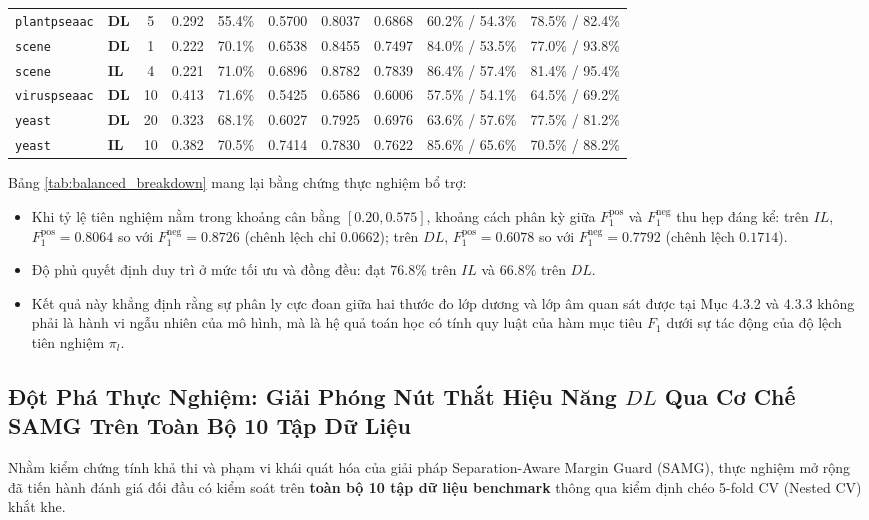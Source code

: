 \documentclass[10pt,a4paper]{article}
\begin{document}
\begin{table}[H]
{\begin{tabular}{llcccccccc}
\texttt{plantpseaac}     & \textbf{DL} & 5   & 0.292 & 55.4\% & 0.5700 & 0.8037 & 0.6868 & 60.2\% / 54.3\% & 78.5\% / 82.4\% \\
\texttt{scene}           & \textbf{DL} & 1   & 0.222 & 70.1\% & 0.6538 & 0.8455 & 0.7497 & 84.0\% / 53.5\% & 77.0\% / 93.8\% \\
\texttt{scene}           & \textbf{IL} & 4   & 0.221 & 71.0\% & 0.6896 & 0.8782 & 0.7839 & 86.4\% / 57.4\% & 81.4\% / 95.4\% \\
\texttt{viruspseaac}     & \textbf{DL} & 10  & 0.413 & 71.6\% & 0.5425 & 0.6586 & 0.6006 & 57.5\% / 54.1\% & 64.5\% / 69.2\% \\
\texttt{yeast}           & \textbf{DL} & 20  & 0.323 & 68.1\% & 0.6027 & 0.7925 & 0.6976 & 63.6\% / 57.6\% & 77.5\% / 81.2\% \\
\texttt{yeast}           & \textbf{IL} & 10  & 0.382 & 70.5\% & 0.7414 & 0.7830 & 0.7622 & 85.6\% / 65.6\% & 70.5\% / 88.2\% \\
\bottomrule
\end{tabular}%
}
\end{table}

Bảng \ref{tab:balanced_breakdown} mang lại bằng chứng thực nghiệm bổ trợ:
\begin{itemize}[leftmargin=*]
    \item Khi tỷ lệ tiên nghiệm nằm trong khoảng cân bằng $[0.20, 0.575]$, khoảng cách phân kỳ giữa $F_1^{\text{pos}}$ và $F_1^{\text{neg}}$ thu hẹp đáng kể: trên $IL$, $F_1^{\text{pos}} = 0.8064$ so với $F_1^{\text{neg}} = 0.8726$ (chênh lệch chỉ $0.0662$); trên $DL$, $F_1^{\text{pos}} = 0.6078$ so với $F_1^{\text{neg}} = 0.7792$ (chênh lệch $0.1714$).
    \item Độ phủ quyết định duy trì ở mức tối ưu và đồng đều: đạt $76.8\%$ trên $IL$ và $66.8\%$ trên $DL$.
    \item Kết quả này khẳng định rằng sự phân ly cực đoan giữa hai thước đo lớp dương và lớp âm quan sát được tại Mục 4.3.2 và 4.3.3 không phải là hành vi ngẫu nhiên của mô hình, mà là hệ quả toán học có tính quy luật của hàm mục tiêu $F_1$ dưới sự tác động của độ lệch tiên nghiệm $\pi_l$.
\end{itemize}

\subsection{Đột Phá Thực Nghiệm: Giải Phóng Nút Thắt Hiệu Năng \texorpdfstring{$DL$}{DL} Qua Cơ Chế SAMG Trên Toàn Bộ 10 Tập Dữ Liệu}
Nhằm kiểm chứng tính khả thi và phạm vi khái quát hóa của giải pháp Separation-Aware Margin Guard (SAMG), thực nghiệm mở rộng đã tiến hành đánh giá đối đầu có kiểm soát trên \textbf{toàn bộ 10 tập dữ liệu benchmark} thông qua kiểm định chéo 5-fold CV (Nested CV) khắt khe. 
\end{document}

